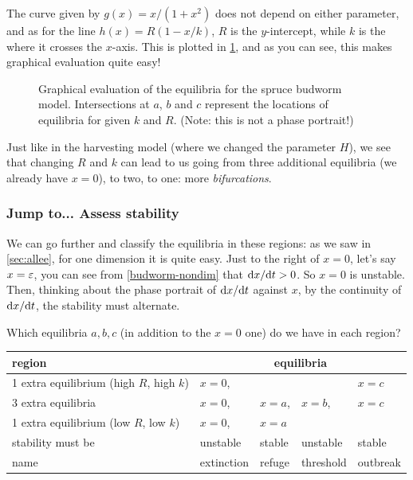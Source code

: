 \documentclass[main.tex]{subfiles}
\begin{document}
The curve given by $g(x) = x/(1 + x^2)$ does not depend on either parameter, and as for the line $h(x) = R(1-x/k)$, $R$ is the $y$-intercept, while $k$ is the where it crosses the $x$-axis. This is plotted in \cref{fig:spruce-1}, and as you can see, this makes graphical evaluation quite easy!

\begin{figure}%
	\centering
	
	\caption{Graphical evaluation of the equilibria for the spruce budworm model. Intersections at $a$, $b$ and $c$ represent the locations of equilibria for given $k$ and $R$. (Note: this is not a phase portrait!)}
	\label{fig:spruce-1}
\end{figure}%

Just like in the harvesting model (where we changed the parameter $H$), we see that changing $R$ and $k$ can lead to us going from three additional equilibria (we already have $x=0$), to two, to one: more \emph{bifurcations}.

\subsubsection{Jump to... \StepFour Assess stability} 
We can go further and classify the equilibria in these regions: as we saw in \cref{sec:allee}, for one dimension it is quite easy. Just to the right of $x=0$, let's say $x=\varepsilon$, you can see from \cref{budworm-nondim} that $\fd{x}{t} > 0$. So $x=0$ is unstable. Then, thinking about the phase portrait of $\fd{x}{t}$ against $x$, by the continuity of $\fd{x}{t}$, the stability must alternate. 

Which equilibria $a,b,c$ (in addition to the $x=0$ one) do we have in each region?
\begin{center}
\begin{tabular}{lllll}
\toprule
	region & \multicolumn{4}{c}{equilibria} \\
\midrule
	1 extra equilibrium (high $R$, high $k$) & $x=0$, & & & $x=c$ \\
	3 extra equilibria & $x=0$, & $x=a$, & $x=b$, & $x=c$ \\
	1 extra equilibrium (low $R$, low $k$) & $x=0$, & $x=a$& & \\		
\midrule
	stability must be & unstable & stable & unstable & stable \\
\midrule
	name & extinction & refuge & threshold & outbreak \\
\bottomrule
\end{tabular}
\end{center}
\end{document}
